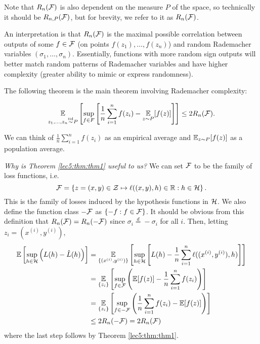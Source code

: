 \begin{remark}
Note that $R_n(\mathcal F)$ is also dependent on the measure $P$ of the space, so technically it should be $R_{n,P}(\mathcal F)$, but for brevity, we refer to it as $R_n(\mathcal F)$.
\end{remark}

An interpretation is that $R_n(\mathcal F)$ is the maximal possible correlation between outputs of some $f \in \mathcal F$ (on points $f(z_1), \dots, f(z_n)$) and random Rademacher variables $ (\sigma_1, \dots, \sigma_n).$ Essentially, functions with more random sign outputs will better match random patterns of Rademacher variables and have higher complexity (greater ability to mimic or express randomness).

The following theorem is the main theorem involving Rademacher complexity:

\begin{theorem} \label{lec5:thm:thm1}
    \begin{align}
       \operatorname*{\mathbb{E}}_{z_1, \dots, z_n \overset{\textup{iid}}{\sim} P} \left[ \sup_{f\in F} \left[ \frac{1}{n} \sum^n_{i=1} f(z_i) -  \operatorname*{\mathbb{E}}_{z\sim P} [f(z)] \right]\right] \leq 2 R_n(\mathcal F). \label{lec5:eqn:thm1}
    \end{align}
\end{theorem}

\begin{remark}
We can think of $\frac{1}{n} \sum^n_{i=1} f(z_i)$ as an empirical average and $\operatorname*{\mathbb{E}}_{z\sim P} [f(z)]$ as a population average.
\end{remark}
\noindent\textit{Why is Theorem \ref{lec5:thm:thm1} useful to us?} We can set $\mathcal F$ to be the family of loss functions, i.e.
\begin{equation}
\mathcal F = \left\{ z = (x,y) \in \mathcal Z \mapsto \ell((x,y),h) \in \mathbb R : h \in \mathcal H \right\}.
\end{equation} 
This is the family of losses induced by the hypothesis functions in $\mathcal H$. We also define the function class $-\mathcal F$ as $\{-f : f \in \mathcal F\}$. It should be obvious from this definition that $R_n(\mathcal F) = R_n(-\mathcal F)$ since $\sigma_i \stackrel{d}{=} -\sigma_i$ for all $i$. Then, letting $z_i = (x^{(i)}, y^{(i)})$,
\begin{align}
    \operatorname*{\mathbb{E}}\left[ \sup_{h \in \mathcal H}\left( L(h) - \hat L (h) \right) \right] &= \operatorname*{\mathbb{E}}_{\{(x^{(i)}, y^{(i)})\}} \left[ \sup_{h \in \mathcal H} \left[L(h) - \frac{1}{n} \sum^n_{i=1} \ell((x^{(i)}, y^{(i)}), h) \right] \right] \\
    &= \operatorname*{\mathbb{E}}_{\{z_i\}} \left[\sup_{f \in \mathcal F} \left(\operatorname*{\mathbb{E}}[f(z)] - \frac{1}{n} \sum^n_{i=1} f(z_i) \right)\right] \\
    &= \operatorname*{\mathbb{E}}_{\{z_i\}} \left[\sup_{f \in -\mathcal F} \left(\frac{1}{n} \sum^n_{i=1} f(z_i) - \operatorname*{\mathbb{E}}[f(z)] \right)\right] \\
    &\leq 2 R_n(-\mathcal F) = 2R_n(\mathcal F)
\end{align}
where the last step follows by Theorem \ref{lec5:thm:thm1}. 

